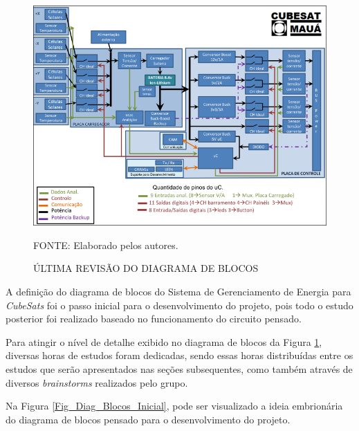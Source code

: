 \documentclass[
	12pt,				%
	openright,			%
	oneside,			%
	a4paper,			%
	english,			%
	french,				%
	spanish,			%
	brazil,				%
	oldfontcommands
	]{abntex2}
\begin{document}
	\begin{figure}[th]
		\caption{ÚLTIMA REVISÃO DO DIAGRAMA DE BLOCOS}
		\label{Fig_Diag_Blocos_Final}
		\centering
		\includegraphics[width=1.0\linewidth]{./figs/diag_blocos}
			
		\begin{small}
			FONTE: Elaborado pelos autores.
		\end{small}		
	\end{figure}
	\pagebreak
	
	A definição do diagrama de blocos do Sistema de Gerenciamento de Energia para \textit{CubeSats} foi o passo inicial para o desenvolvimento do projeto, pois todo o estudo posterior foi realizado baseado no funcionamento do circuito pensado.

	Para atingir o nível de detalhe exibido no diagrama de blocos da Figura \ref{Fig_Diag_Blocos_Final}, diversas horas de estudos foram dedicadas, sendo essas horas distribuídas entre os estudos que serão apresentados nas seções subsequentes, como também através de diversos \textit{brainstorms} realizados pelo grupo.
	
	Na Figura \ref{Fig_Diag_Blocos_Inicial}, pode ser visualizado a ideia embrionária do diagrama de blocos pensado para o desenvolvimento do projeto.
		
\end{document}
